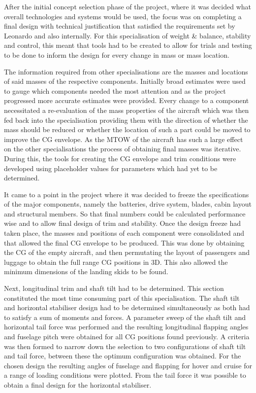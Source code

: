\documentclass[11pt,a4paper]{article}
\begin{document}
After the initial concept selection phase of the project, where it was decided what overall technologies and systems would be used, the focus was on completing a final design with technical justification that satisfied the requirements set by Leonardo and also internally. For this specialisation of weight \& balance, stability and control, this meant that tools had to be created to allow for trials and testing to be done to inform the design for every change in mass or mass location.

The information required from other specialisations are the masses and locations of said masses of the respective components. Initially broad estimates were used to gauge which components needed the most attention and as the project progressed more accurate estimates were provided. Every change to a component necessitated a re-evaluation of the mass properties of the aircraft which was then fed back into the specialisation providing them with the direction of whether the mass should be reduced or whether the location of such a part could be moved to improve the CG envelope. As the MTOW of the aircraft has such a large effect on the other specialisations the process of obtaining final masses was iterative. During this, the tools for creating the  CG envelope and trim conditions were developed using placeholder values for parameters which had yet to be determined.

It came to a point in the project where it was decided to freeze the specifications of the major components, namely the batteries, drive system, blades, cabin layout and structural members. So that final numbers could be calculated performance wise and to allow final design of trim and stability.
Once the design freeze had taken place, the masses and positions of each component were consolidated and that allowed the final CG envelope to be produced. This was done by obtaining the CG of the empty aircraft, and then permutating the layout of passengers and luggage to obtain the full range CG positions in 3D. This also allowed the minimum dimensions of the landing skids to be found. 

Next, longitudinal trim and shaft tilt had to be determined. This section constituted the most time consuming part of this specialisation. The shaft tilt and horizontal stabiliser design had to be determined simultaneously as both had to satisfy a sum of moments and forces. A parameter sweep of the shaft tilt and horizontal tail force was performed and the resulting longitudinal flapping angles and fuselage pitch were obtained for all CG positions found previously. A criteria was then formed to narrow down the selection to two configurations of shaft tilt and tail force, between these the optimum configuration was obtained. For the chosen design the resulting angles of fuselage and flapping for hover and cruise for a range of loading conditions were plotted. From the tail force it was possible to obtain a final design for the horizontal stabiliser.
\end{document}
